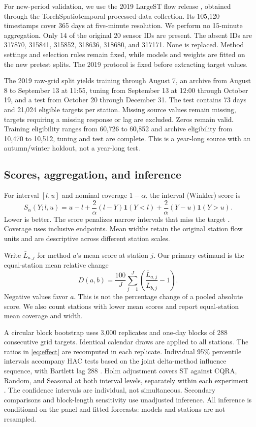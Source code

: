 \documentclass[11pt]{article}
\newcommand{\ind}{\mathbf 1}
\begin{document}
For new-period validation, we use the 2019 LargeST flow release \cite{largest}, obtained through the TorchSpatiotemporal processed-data collection. Its 105,120 timestamps cover 365 days at five-minute resolution. We perform no 15-minute aggregation. Only 14 of the original 20 sensor IDs are present. The absent IDs are 317870, 315841, 315852, 318636, 318680, and 317171. None is replaced. Method settings and selection rules remain fixed, while models and weights are fitted on the new pretest splits. The 2019 protocol is fixed before extracting target values.

The 2019 raw-grid split yields training through August 7, an archive from August 8 to September 13 at 11:55, tuning from September 13 at 12:00 through October 19, and a test from October 20 through December 31. The test contains 73 days and 21,024 eligible targets per station. Missing source values remain missing, targets requiring a missing response or lag are excluded. Zeros remain valid. Training eligibility ranges from 60,726 to 60,852 and archive eligibility from 10,470 to 10,512, tuning and test are complete. This is a year-long source with an autumn/winter holdout, not a year-long test.

\subsection{Scores, aggregation, and inference}
For interval $[l,u]$ and nominal coverage $1-\alpha$, the interval (Winkler) score is
\begin{equation}\label{eq:score}
S_\alpha(Y;l,u)=u-l+\frac2\alpha(l-Y)\ind(Y<l)
+\frac2\alpha(Y-u)\ind(Y>u).
\end{equation}
Lower is better. The score penalizes narrow intervals that miss the target \cite{score}. Coverage uses inclusive endpoints. Mean widths retain the original station flow units and are descriptive across different station scales.

Write $\bar L_{a,j}$ for method $a$'s mean score at station $j$. Our primary estimand is the equal-station mean relative change
\begin{equation}\label{eq:effect}
D(a,b)=\frac{100}{J}\sum_{j=1}^J\left(\frac{\bar L_{a,j}}{\bar L_{b,j}}-1\right).
\end{equation}
Negative values favor $a$. This is not the percentage change of a pooled absolute score. We also count stations with lower mean scores and report equal-station mean coverage and width.

A circular block bootstrap uses 3,000 replicates and one-day blocks of 288 consecutive grid targets. Identical calendar draws are applied to all stations. The ratios in \eqref{eq:effect} are recomputed in each replicate. Individual 95\% percentile intervals accompany HAC tests based on the joint delta-method influence sequence, with Bartlett lag 288 \cite{nw}. Holm adjustment covers ST against CQRA, Random, and Seasonal at both interval levels, separately within each experiment \cite{holm}. The confidence intervals are individual, not simultaneous. Secondary comparisons and block-length sensitivity use unadjusted inference. All inference is conditional on the panel and fitted forecasts: models and stations are not resampled.
\end{document}
